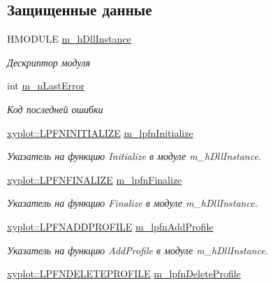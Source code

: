 \subsection*{Защищенные данные}
\begin{DoxyCompactItemize}
\item 
H\-M\-O\-D\-U\-L\-E \hyperlink{classxyplot_1_1_x_y_plot_manager_a1ddc519fd38e08cba67f11f4d2fad942}{m\-\_\-h\-Dll\-Instance}
\begin{DoxyCompactList}\small\item\em Дескриптор модуля \end{DoxyCompactList}\item 
int \hyperlink{classxyplot_1_1_x_y_plot_manager_ac842be5823171dc50111c6c4c62f1311}{m\-\_\-n\-Last\-Error}
\begin{DoxyCompactList}\small\item\em Код последней ошибки \end{DoxyCompactList}\item 
\hyperlink{namespacexyplot_a8c5635641ba2648c95a8b29c01393f78}{xyplot\-::\-L\-P\-F\-N\-I\-N\-I\-T\-I\-A\-L\-I\-Z\-E} \hyperlink{group__gr_func_pointers_ga4c9ea3fa9c04a9f11e5efbbf45484a77}{m\-\_\-lpfn\-Initialize}
\begin{DoxyCompactList}\small\item\em Указатель на функцию Initialize в модуле m\-\_\-h\-Dll\-Instance. \end{DoxyCompactList}\item 
\hyperlink{namespacexyplot_a0c97b982a01a1c43f6900a274d295b11}{xyplot\-::\-L\-P\-F\-N\-F\-I\-N\-A\-L\-I\-Z\-E} \hyperlink{group__gr_func_pointers_ga9cdc9837f474268e30378babb487589c}{m\-\_\-lpfn\-Finalize}
\begin{DoxyCompactList}\small\item\em Указатель на функцию Finalize в модуле m\-\_\-h\-Dll\-Instance. \end{DoxyCompactList}\item 
\hyperlink{namespacexyplot_ab78664aa6b50a88a556408cdcb0fedde}{xyplot\-::\-L\-P\-F\-N\-A\-D\-D\-P\-R\-O\-F\-I\-L\-E} \hyperlink{group__gr_func_pointers_gaa98936db9e4efece553498398bc6d097}{m\-\_\-lpfn\-Add\-Profile}
\begin{DoxyCompactList}\small\item\em Указатель на функцию Add\-Profile в модуле m\-\_\-h\-Dll\-Instance. \end{DoxyCompactList}\item 
\hyperlink{namespacexyplot_af6412b804e2c4c568501d1a6e84358cd}{xyplot\-::\-L\-P\-F\-N\-D\-E\-L\-E\-T\-E\-P\-R\-O\-F\-I\-L\-E} \hyperlink{group__gr_func_pointers_ga7966fea312b93dc5a52ba8f913fcc835}{m\-\_\-lpfn\-Delete\-Profile}

\end{DoxyCompactItemize}
